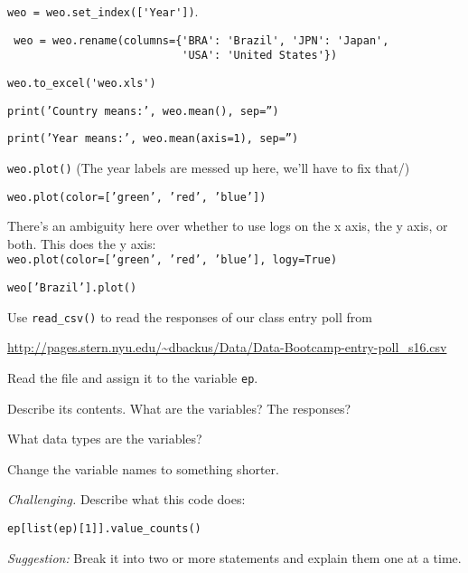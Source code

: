 \documentclass[11pt]{exam}
\begin{document}
\begin{questions}
\begin{solution}
\begin{parts}
\item \verb|weo = weo.set_index(['Year'])|.

\item \verb| weo = weo.rename(columns={'BRA': 'Brazil', 'JPN': 'Japan', | \\
      \verb|                           'USA': 'United States'})|

\item \verb|weo.to_excel('weo.xls')|

\item {\tt print('Country means:', weo.mean(), sep='')}

\item {\tt print('Year means:', weo.mean(axis=1), sep='')}

\item {\tt weo.plot()}
(The year labels are messed up here, we'll have to fix that/)

\item {\tt weo.plot(color=['green', 'red', 'blue'])}

\item There's an ambiguity here over whether to use logs on the x axis, the y axis, or both.  This does the y axis:  \\ {\tt weo.plot(color=['green', 'red', 'blue'], logy=True)}

\item {\tt weo['Brazil'].plot()}

\end{parts}
\end{solution}

\item Use \verb|read_csv()| to read the responses of our class entry poll from

\vspace{0.1in}
\centerline{\url{http://pages.stern.nyu.edu/~dbackus/Data/Data-Bootcamp-entry-poll_s16.csv}}
\vspace{0.1in}

\begin{parts}
\item Read the file and assign it to the variable {\tt ep}.
\item Describe its contents.  What are the variables?  The responses?
\item What data types are the variables?
\item Change the variable names to something shorter.
\item {\it Challenging.\/}
Describe what this code does:
\begin{verbatim}
ep[list(ep)[1]].value_counts()
\end{verbatim}
{\it Suggestion:\/} Break it into two or more statements and explain them one at a time.
\end{parts}


\end{questions}
\end{document}
